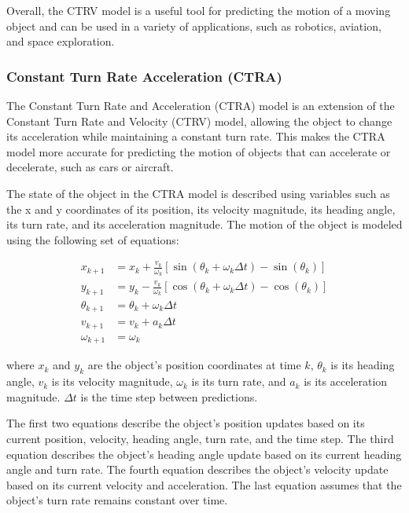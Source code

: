 Overall, the CTRV model is a useful tool for predicting the motion of a moving object and can be used in a variety of applications, such as robotics, aviation, and space exploration.

\subsubsection{Constant Turn Rate Acceleration (CTRA)}
\label{subsubsec:3_CTRA}

The Constant Turn Rate and Acceleration (CTRA) model is an extension of the Constant Turn Rate and Velocity (CTRV) model, allowing the object to change its acceleration while maintaining a constant turn rate. This makes the CTRA model more accurate for predicting the motion of objects that can accelerate or decelerate, such as cars or aircraft.

The state of the object in the CTRA model is described using variables such as the x and y coordinates of its position, its velocity magnitude, its heading angle, its turn rate, and its acceleration magnitude. The motion of the object is modeled using the following set of equations:

\begin{equation}
\begin{split}
		x_{k+1} &= x_k + \frac{v_k}{\omega_k} \left[ \sin(\theta_k + \omega_k \Delta t) - \sin(\theta_k) \right] \\
		y_{k+1} &= y_k - \frac{v_k}{\omega_k} \left[ \cos(\theta_k + \omega_k \Delta t) - \cos(\theta_k) \right] \\
		\theta_{k+1} &= \theta_k + \omega_k \Delta t \\
		v_{k+1} &= v_k + a_k \Delta t \\
		\omega_{k+1} &= \omega_k
\end{split}
\end{equation}

where $x_k$ and $y_k$ are the object's position coordinates at time $k$, $\theta_k$ is its heading angle, $v_k$ is its velocity magnitude, $\omega_k$ is its turn rate, and $a_k$ is its acceleration magnitude. $\Delta t$ is the time step between predictions.

The first two equations describe the object's position updates based on its current position, velocity, heading angle, turn rate, and the time step. The third equation describes the object's heading angle update based on its current heading angle and turn rate. The fourth equation describes the object's velocity update based on its current velocity and acceleration. The last equation assumes that the object's turn rate remains constant over time.

